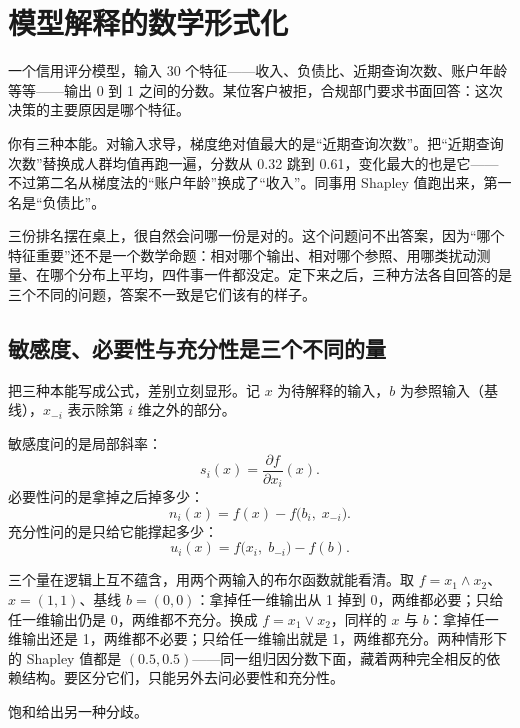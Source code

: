 \section{模型解释的数学形式化}
\label{sec:14-Deep-Learning/10-Interpretability-Mathematics/04}

一个信用评分模型，输入 30 个特征——收入、负债比、近期查询次数、账户年龄等等——输出 0 到 1 之间的分数。某位客户被拒，合规部门要求书面回答：这次决策的主要原因是哪个特征。

你有三种本能。对输入求导，梯度绝对值最大的是``近期查询次数''。把``近期查询次数''替换成人群均值再跑一遍，分数从 0.32 跳到 0.61，变化最大的也是它——不过第二名从梯度法的``账户年龄''换成了``收入''。同事用 Shapley 值跑出来，第一名是``负债比''。

三份排名摆在桌上，很自然会问哪一份是对的。这个问题问不出答案，因为``哪个特征重要''还不是一个数学命题：相对哪个输出、相对哪个参照、用哪类扰动测量、在哪个分布上平均，四件事一件都没定。定下来之后，三种方法各自回答的是三个不同的问题，答案不一致是它们该有的样子。

\subsection{敏感度、必要性与充分性是三个不同的量}

把三种本能写成公式，差别立刻显形。记 \(x\) 为待解释的输入，\(b\) 为参照输入（基线），\(x_{-i}\) 表示除第 \(i\) 维之外的部分。

敏感度问的是局部斜率：
\[
s_i(x)=\frac{\partial f}{\partial x_i}(x).
\]
必要性问的是拿掉之后掉多少：
\[
n_i(x)=f(x)-f\bigl(b_i,\;x_{-i}\bigr).
\]
充分性问的是只给它能撑起多少：
\[
u_i(x)=f\bigl(x_i,\;b_{-i}\bigr)-f(b).
\]

三个量在逻辑上互不蕴含，用两个两输入的布尔函数就能看清。取 \(f=x_1\wedge x_2\)、\(x=(1,1)\)、基线 \(b=(0,0)\)：拿掉任一维输出从 1 掉到 0，两维都必要；只给任一维输出仍是 0，两维都不充分。换成 \(f=x_1\vee x_2\)，同样的 \(x\) 与 \(b\)：拿掉任一维输出还是 1，两维都不必要；只给任一维输出就是 1，两维都充分。两种情形下的 Shapley 值都是 \((0.5,0.5)\)——同一组归因分数下面，藏着两种完全相反的依赖结构。要区分它们，只能另外去问必要性和充分性。

饱和给出另一种分歧。

